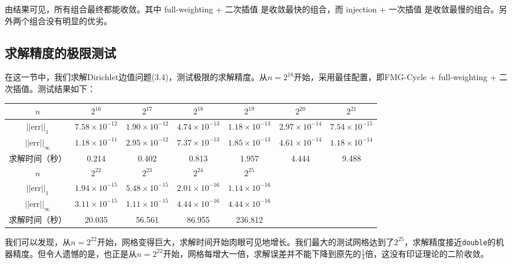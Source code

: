 \documentclass[lang=cn,10pt]{elegantbook}
\begin{document}
由结果可见，所有组合最终都能收敛。其中 full-weighting + 二次插值 是收敛最快的组合，而 injection + 一次插值 是收敛最慢的组合。另外两个组合没有明显的优劣。

\subsection{求解精度的极限测试}

在这一节中，我们求解Dirichlet边值问题(3.4)，测试极限的求解精度。从$n=2^{16}$开始，采用最佳配置，即FMG-Cycle + full-weighting + 二次插值。测试结果如下：

\begin{table}[H]
  \centering
  \small
  \begin{tabular}{c|cccccc}
  \hline
    \textbf{$n$}                 & $2^{16}$                 & $2^{17}$                 & $2^{18}$                 & $2^{19}$                & $2^{20}$                 & $2^{21}$              \\ \hline
  $||\text{err}||_1$      & $7.58\times 10^{-12}$ & $1.90\times 10^{-12}$ & $4.74\times 10^{-13}$ & $1.18\times 10^{-13}$ & $2.97\times 10^{-14}$ & $7.54\times 10^{-15}$  \\
  $||\text{err}||_\infty$      & $1.18\times 10^{-11}$ & $2.95\times 10^{-12}$ & $7.37\times 10^{-13}$ & $1.85\times 10^{-13}$ & $4.61\times 10^{-14}$ & $1.18\times 10^{-14}$  \\
  求解时间（秒）                 & 0.214 & 0.402 & 0.813 & 1.957 & 4.444 & 9.488 \\ \hline 
  \textbf{$n$}                 & $2^{22}$                 & $2^{23}$                 & $2^{24}$                 & $2^{25}$             \\ \hline
  $||\text{err}||_1$      & $1.94\times 10^{-15}$ & $5.48\times 10^{-15}$ & $2.01\times 10^{-16}$ & $1.14\times 10^{-16}$ \\
  $||\text{err}||_\infty$      & $3.11\times 10^{-15}$ & $1.11\times 10^{-15}$ & $4.44\times 10^{-16}$ & $4.44\times 10^{-16}$  \\
  求解时间（秒）                 & 20.035 & 56.561 & 86.955 & 236.812 \\ \hline
  \end{tabular}
\end{table}

我们可以发现，从$n=2^{22}$开始，网格变得巨大，求解时间开始肉眼可见地增长。我们最大的测试网格达到了$2^{25}$，求解精度接近\verb|double|的机器精度。但令人遗憾的是，也正是从$n=2^{22}$开始，网格每增大一倍，求解误差并不能下降到原先的$\frac{1}{4}$倍，这没有印证理论的二阶收敛。
\end{document}
